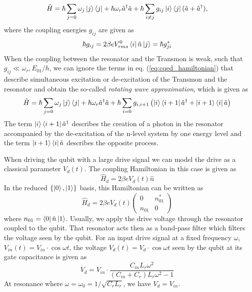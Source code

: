%
\begin{equation}
\hat{H} = \hbar \sum\limits_{j=0} \omega_j \left| j \right>\left< j \right| + \hbar \omega_r \hat{a}^\dagger \hat{a} + \hbar \sum\limits_{i\ne j} g_{ij} \left| i \right>\left< j \right|(\hat{a}+\hat{a}^\dagger), \label{eq:cqed_hamiltonian}
\end{equation}
%
where the coupling energies $g_{ij}$ are given as
%
\begin{equation}
\hbar g_{ij} = 2\beta e V_{rms}^0 \left< i \right|\hat{n}\left| j \right> = \hbar g_{ji}^*
\end{equation}
%
When the coupling between the resonator and the Transmon is weak, such that $g_{ij} \ll \omega_r,E_{01}/h$, we can ignore the terms in eq. (\ref{eq:cqed_hamiltonian}) that describe simultaneous excitation or de-excitation of the Transmon and the resonator and obtain the so-called {\it rotating wave approximation}, which is given as
%
\begin{equation}
\hat{H} = \hbar \sum\limits_{j=0} \omega_j \left| j \right>\left< j \right|+\hbar \omega_r \hat{a}^\dagger \hat{a} + \hbar \sum\limits_{i=0} g_{i,i+1}\left(\left| i \right>\left< i+1 \right|\hat{a}^\dagger +\left| i+1 \right>\left< i \right|\hat{a}\right) \label{eq:cqed_rotating_wave}
\end{equation}
%
The term $\left| i \right>\left< i+1 \right|\hat{a}^\dagger$ describes the creation of a photon in the resonator accompanied by the de-excitation of the n-level system by one energy level and the term $\left| i+1 \right>\left< i \right|\hat{a}$ describes the opposite process.

\smallskip

When driving the qubit with a large drive signal we can model the drive as a classical parameter $V_d(t)$. The coupling Hamiltonian in this case is given as
%
\begin{equation}
\hat{H}_d = 2\beta e V_d(t) \hat{n}
\end{equation}
%
In the reduced $\{\left| 0 \right>,\left| 1 \right>\}$ basis, this Hamiltonian can be written as
%
\begin{equation}
\hat{H}_d = 2\beta e V_d(t)\left(\begin{array}{cc} 0 & n_{01}^* \\ n_{01} & 0 \end{array}\right) \label{eq:drive_hamiltonian}
\end{equation}
%
where $n_{01} = \left< 0 \right|\hat{n}\left| 1 \right>$. Usually, we apply the drive voltage through the resonator coupled to the qubit. That resonator acts then as a band-pass filter which filters the voltage seen by the qubit. For an input drive signal at a fixed frequency $\omega$, $V_{in}(t)=V_{in}\cdot\cos{\omega t}$, the voltage $V_d(t)=V_{d}\cdot\cos{\omega t}$ seen by the qubit at its gate capacitance is given as
%
\begin{equation}
V_d = V_{in}\cdot\frac{C_{in}L_r \omega^2}{(C_{in}+C_r)L_r\omega^2-1} \label{eq:qubit_drive_voltage}
\end{equation}
%
At resonance where $\omega=\omega_0=1/\sqrt{C_r L_r}$, we have $V_d = V_{in}$.

